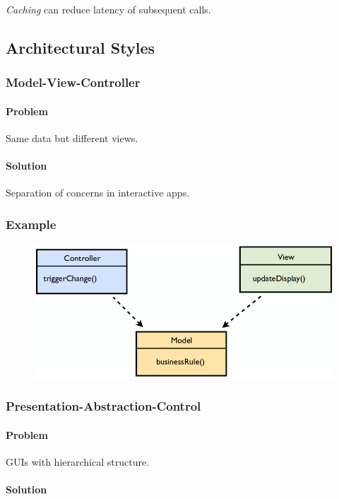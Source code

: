 \documentclass[twocolumn,english]{article}
\begin{document}
\emph{Caching} can reduce latency of subsequent calls.

\subsection{Architectural Styles}

\subsubsection{Model-View-Controller}

\paragraph{Problem}

Same data but different views.

\paragraph{Solution}

Separation of concerns in interactive apps.

\subsubsection*{Example}

\begin{figure}[H]
\centering{}\includegraphics[width=0.45\columnwidth]{img/mvc}
\end{figure}

\subsubsection{Presentation-Abstraction-Control}

\paragraph{Problem}

GUIs with hierarchical structure.

\paragraph{Solution}
\end{document}
